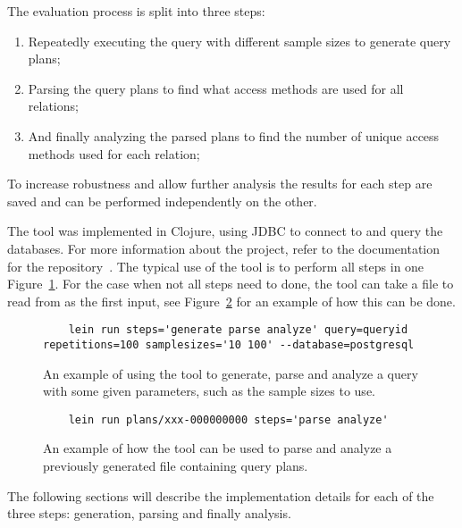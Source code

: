 The evaluation process is split into three steps:
\begin{enumerate}
\item Repeatedly executing the query with different sample sizes to generate
  query plans;
\item Parsing the query plans to find what access methods are used for all
  relations;
\item And finally analyzing the parsed plans to find the number of unique access
  methods used for each relation;
\end{enumerate}

To increase robustness and allow further analysis the results for each step are
saved and can be performed independently on the other.

The tool was implemented in Clojure, using JDBC to connect to and query the
databases. For more information about the project, refer to the documentation for
the repository~\cite{barksten_mbark_m}. The typical use of the tool is to perform all steps in one
Figure~\ref{fig:cmd:runtool1}. For the case when not all steps need to done, the
tool can take a file to read from as the first input, see
Figure~\ref{fig:cmd:runtool2} for an example of how this can be done.

\begin{figure}[ht]
  \begin{verbatim}
    lein run steps='generate parse analyze' query=queryid repetitions=100 samplesizes='10 100' --database=postgresql
  \end{verbatim}
  \caption[Using the tool to generate, parse and analyze a query]{An example of
    using the tool to generate, parse and analyze a query with some given
    parameters, such as the sample sizes to use.}
  \label{fig:cmd:runtool1}
\end{figure}

\begin{figure}[ht]
  \begin{verbatim}
    lein run plans/xxx-000000000 steps='parse analyze'
  \end{verbatim}
  \caption[Using the tool to parse and analyze a previously generated plan]{An
    example of how the tool can be used to parse and analyze a previously
    generated file containing query plans.}
  \label{fig:cmd:runtool2}
\end{figure}

The following sections will describe the implementation details for each of the
three steps: generation, parsing and finally analysis.

